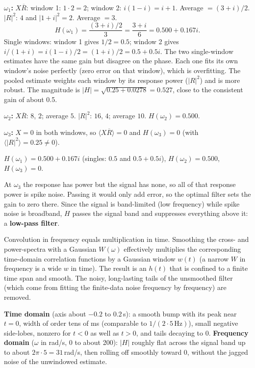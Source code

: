 \documentclass[10pt,letterpaper]{article}
\newcommand{\ans}[1]{\par\vspace{3pt}{\bfseries #1}\quad}
\begin{document}
\ans{4b.}
\textbf{$\omega_1$:}
$X\overline R$: window 1: $1\cdot 2 = 2$; window 2: $i(1 - i) = i + 1$. Average $= (3 + i)/2$.
$|R|^2$: $4$ and $|1+i|^2 = 2$. Average $= 3$.
\[
H(\omega_1) = \frac{(3+i)/2}{3} = \frac{3+i}{6} = 0.500 + 0.167i.
\]
Single windows: window 1 gives $1/2 = 0.5$; window 2 gives $i/(1+i) = i(1-i)/2 = (1+i)/2 = 0.5 + 0.5i$. The two single-window estimates have the same gain but disagree on the phase. Each one fits its own window's noise perfectly (zero error on that window), which is overfitting. The pooled estimate weights each window by its response power ($|R|^2$) and is more robust. The magnitude is $|H| = \sqrt{0.25 + 0.0278} = 0.527$, close to the consistent gain of about 0.5.

\textbf{$\omega_2$:} $X\overline R$: $8$, $2$; average $5$. $|R|^2$: $16$, $4$; average $10$. $H(\omega_2) = 0.500$.

\textbf{$\omega_3$:} $X = 0$ in both windows, so $\langle X\overline R\rangle = 0$ and $H(\omega_3) = 0$ (with $\langle|R|^2\rangle = 0.25 \ne 0$).
\begin{result}
$H(\omega_1) = 0.500 + 0.167i$ (singles: $0.5$ and $0.5 + 0.5i$), $H(\omega_2) = 0.500$, $H(\omega_3) = 0$.
\end{result}
At $\omega_3$ the response has power but the signal has none, so all of that response power is spike noise. Passing it would only add error, so the optimal filter sets the gain to zero there. Since the signal is band-limited (low frequency) while spike noise is broadband, $H$ passes the signal band and suppresses everything above it: a \textbf{low-pass filter}.

\ans{4c.}
Convolution in frequency equals multiplication in time. Smoothing the cross- and power-spectra with a Gaussian $W(\omega)$ effectively multiplies the corresponding time-domain correlation functions by a Gaussian window $w(t)$ (a narrow $W$ in frequency is a wide $w$ in time). The result is an $h(t)$ that is confined to a finite time span and smooth. The noisy, long-lasting tails of the unsmoothed filter (which come from fitting the finite-data noise frequency by frequency) are removed.
\begin{sketch}
\textbf{Time domain} (axis about $-0.2$ to $0.2$\,s): a smooth bump with its peak near $t = 0$, width of order tens of ms (comparable to $1/(2\cdot 5\,\mathrm{Hz})$), small negative side-lobes, nonzero for $t < 0$ as well as $t > 0$, and tails decaying to 0.
\textbf{Frequency domain} ($\omega$ in rad/s, 0 to about 200): $|H|$ roughly flat across the signal band up to about $2\pi\cdot 5 = 31$\,rad/s, then rolling off smoothly toward 0, without the jagged noise of the unwindowed estimate.
\end{sketch}
\end{document}
